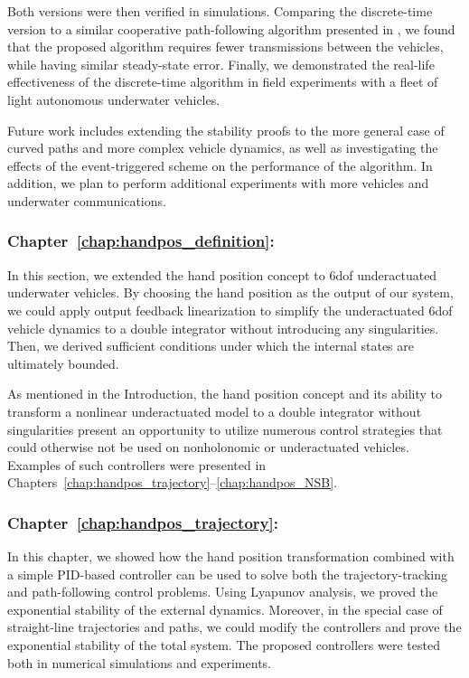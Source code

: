 Both versions were then verified in simulations.
Comparing the discrete-time version to a similar cooperative path-following algorithm presented in \cite{praveen_cooperative_2018}, we found 
that the proposed algorithm requires fewer transmissions between the vehicles, while having similar steady-state error.
Finally, we demonstrated the real-life effectiveness of the discrete-time algorithm in field experiments with a fleet of light autonomous underwater vehicles.

Future work includes extending the stability proofs to the more general case of curved paths and more complex vehicle dynamics, as well as investigating the effects of the event-triggered scheme on the performance of the algorithm.
In addition, we plan to perform additional experiments with more vehicles and underwater communications.

\subsubsection{Chapter~\ref{chap:handpos_definition}: }

In this section, we extended the hand position concept to 6\gls{dof} underactuated underwater vehicles.
By choosing the hand position as the output of our system, we could apply output feedback linearization to simplify the underactuated 6\gls{dof} vehicle dynamics to a double integrator without introducing any singularities.
Then, we derived sufficient conditions under which the internal states are ultimately bounded.

As mentioned in the Introduction, the hand position concept and its ability to transform a nonlinear underactuated model to a double integrator without singularities present an opportunity to utilize numerous control strategies that could otherwise not be used on nonholonomic or underactuated vehicles.
Examples of such controllers were presented in Chapters~\ref{chap:handpos_trajectory}--\ref{chap:handpos_NSB}.

\subsubsection{Chapter~\ref{chap:handpos_trajectory}: }

In this chapter, we showed how the hand position transformation combined with a simple PID-based controller can be used to solve both the trajectory-tracking and path-following control problems.
Using Lyapunov analysis, we proved the exponential stability of the external dynamics.
Moreover, in the special case of straight-line trajectories and paths, we could modify the controllers and prove the exponential stability of the total system.
The proposed controllers were tested both in numerical simulations and experiments.

